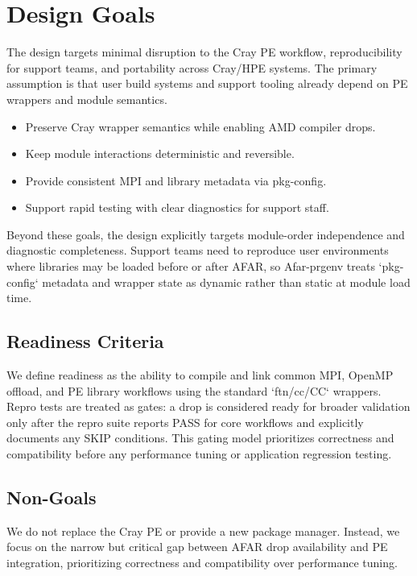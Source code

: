 \section{Design Goals}
\label{sec:design}
The design targets minimal disruption to the Cray PE workflow, reproducibility
for support teams, and portability across Cray/HPE systems. The primary
assumption is that user build systems and support tooling already depend on PE
wrappers and module semantics.

\begin{itemize}
  \item Preserve Cray wrapper semantics while enabling AMD compiler drops.
  \item Keep module interactions deterministic and reversible.
  \item Provide consistent MPI and library metadata via pkg-config.
  \item Support rapid testing with clear diagnostics for support staff.
\end{itemize}

Beyond these goals, the design explicitly targets module-order independence and
diagnostic completeness. Support teams need to reproduce user environments
where libraries may be loaded before or after AFAR, so Afar-prgenv treats
`pkg-config` metadata and wrapper state as dynamic rather than static at module
load time.

\subsection{Readiness Criteria}
\label{sec:readiness}
We define readiness as the ability to compile and link common MPI, OpenMP
offload, and PE library workflows using the standard `ftn/cc/CC` wrappers.
Repro tests are treated as gates: a drop is considered ready for broader
validation only after the repro suite reports PASS for core workflows and
explicitly documents any SKIP conditions. This gating model prioritizes
correctness and compatibility before any performance tuning or application
regression testing.

\subsection{Non-Goals}
\label{sec:nongoals}
We do not replace the Cray PE or provide a new package manager. Instead, we
focus on the narrow but critical gap between AFAR drop availability and PE
integration, prioritizing correctness and compatibility over performance tuning.
